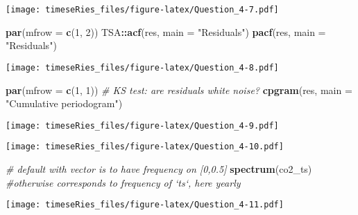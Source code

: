 \documentclass[]{book}
\newenvironment{Shaded}{\begin{snugshade}}{\end{snugshade}}
\newcommand{\KeywordTok}[1]{\textcolor[rgb]{0.13,0.29,0.53}{\textbf{#1}}}
\newcommand{\DataTypeTok}[1]{\textcolor[rgb]{0.13,0.29,0.53}{#1}}
\newcommand{\DecValTok}[1]{\textcolor[rgb]{0.00,0.00,0.81}{#1}}
\newcommand{\StringTok}[1]{\textcolor[rgb]{0.31,0.60,0.02}{#1}}
\newcommand{\CommentTok}[1]{\textcolor[rgb]{0.56,0.35,0.01}{\textit{#1}}}
\newcommand{\OperatorTok}[1]{\textcolor[rgb]{0.81,0.36,0.00}{\textbf{#1}}}
\newcommand{\NormalTok}[1]{#1}
\begin{document}
\texttt{[image: timeseRies\_files/figure-latex/Question\_4-7.pdf]}

\begin{Shaded}
\begin{Highlighting}[]
\KeywordTok{par}\NormalTok{(}\DataTypeTok{mfrow =} \KeywordTok{c}\NormalTok{(}\DecValTok{1}\NormalTok{, }\DecValTok{2}\NormalTok{))}
\NormalTok{TSA}\OperatorTok{::}\KeywordTok{acf}\NormalTok{(res, }\DataTypeTok{main =} \StringTok{"Residuals"}\NormalTok{)}
\KeywordTok{pacf}\NormalTok{(res, }\DataTypeTok{main =} \StringTok{"Residuals"}\NormalTok{)}
\end{Highlighting}
\end{Shaded}

\texttt{[image: timeseRies\_files/figure-latex/Question\_4-8.pdf]}

\begin{Shaded}
\begin{Highlighting}[]
\KeywordTok{par}\NormalTok{(}\DataTypeTok{mfrow =} \KeywordTok{c}\NormalTok{(}\DecValTok{1}\NormalTok{, }\DecValTok{1}\NormalTok{))}
\CommentTok{# KS test: are residuals white noise?}
\KeywordTok{cpgram}\NormalTok{(res, }\DataTypeTok{main =} \StringTok{"Cumulative periodogram"}\NormalTok{)}
\end{Highlighting}
\end{Shaded}

\texttt{[image: timeseRies\_files/figure-latex/Question\_4-9.pdf]}

\begin{Shaded}
\end{Shaded}

\texttt{[image: timeseRies\_files/figure-latex/Question\_4-10.pdf]}

\begin{Shaded}
\begin{Highlighting}[]
\CommentTok{# default with vector is to have frequency on [0,0.5]}
\KeywordTok{spectrum}\NormalTok{(co2_ts)  }\CommentTok{#otherwise corresponds to frequency of `ts`, here yearly}
\end{Highlighting}
\end{Shaded}

\texttt{[image: timeseRies\_files/figure-latex/Question\_4-11.pdf]}
\end{document}
